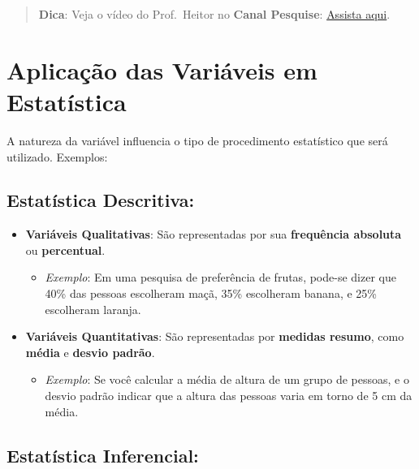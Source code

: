 \documentclass[
]{book}
\providecommand{\tightlist}{%
  \setlength{\itemsep}{0pt}\setlength{\parskip}{0pt}}
\begin{document}
\begin{quote}
\textbf{Dica}: Veja o vídeo do Prof.~Heitor no \textbf{Canal Pesquise}: \href{https://youtu.be/_oc37Ea_tl8}{Assista aqui}.
\end{quote}

\section{Aplicação das Variáveis em Estatística}\label{aplicauxe7uxe3o-das-variuxe1veis-em-estatuxedstica}

A natureza da variável influencia o tipo de procedimento estatístico que será utilizado. Exemplos:

\subsection{Estatística Descritiva:}\label{estatuxedstica-descritiva-1}

\begin{itemize}
\tightlist
\item
  \textbf{Variáveis Qualitativas}: São representadas por sua \textbf{frequência absoluta} ou \textbf{percentual}.

  \begin{itemize}
  \tightlist
  \item
    \emph{Exemplo}: Em uma pesquisa de preferência de frutas, pode-se dizer que 40\% das pessoas escolheram maçã, 35\% escolheram banana, e 25\% escolheram laranja.
  \end{itemize}
\item
  \textbf{Variáveis Quantitativas}: São representadas por \textbf{medidas resumo}, como \textbf{média} e \textbf{desvio padrão}.

  \begin{itemize}
  \tightlist
  \item
    \emph{Exemplo}: Se você calcular a média de altura de um grupo de pessoas, e o desvio padrão indicar que a altura das pessoas varia em torno de 5 cm da média.
  \end{itemize}
\end{itemize}

\subsection{Estatística Inferencial:}\label{estatuxedstica-inferencial-1}
\end{document}
